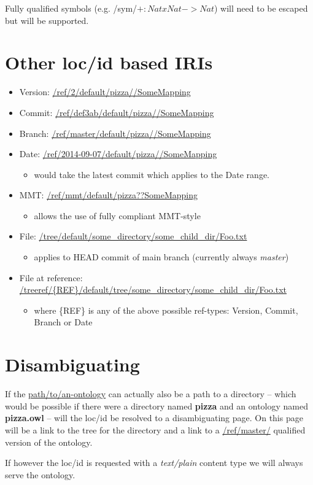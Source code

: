 \documentclass[a4paper,11pt,DIV=22]{scrartcl}
\begin{document}
Fully qualified symbols (e.g. /sym/$+:NatxNat->Nat$) will need to be escaped
but will be supported.

\section{Other loc/id based IRIs}

\begin{itemize}
  \item Version: \url{/ref/2/default/pizza//SomeMapping}
  \item Commit: \url{/ref/def3ab/default/pizza//SomeMapping}
  \item Branch: \url{/ref/master/default/pizza//SomeMapping}
  \item Date: \url{/ref/2014-09-07/default/pizza//SomeMapping}
    \begin{itemize}
      \item would take the latest commit which applies to the Date range.
    \end{itemize}
  \item MMT: \url{/ref/mmt/default/pizza??SomeMapping}
    \begin{itemize}
      \item allows the use of fully compliant MMT-style
    \end{itemize}
  \item File: \url{/tree/default/some_directory/some_child_dir/Foo.txt}
    \begin{itemize}
      \item applies to HEAD commit of main branch (currently always \emph{master})
    \end{itemize}
  \item File at reference: \url{/treeref/{REF}/default/tree/some_directory/some_child_dir/Foo.txt}
    \begin{itemize}
      \item where \{REF\} is any of the above possible ref-types: Version, Commit, Branch or Date
    \end{itemize}
\end{itemize}

\section{Disambiguating}

If the \url{path/to/an-ontology} can actually also be a path to a directory  --
which would be possible if there were a directory named \textbf{pizza} and an
ontology named \textbf{pizza.owl} -- will the loc/id be resolved to a
disambiguating page. On this page will be a link to the tree for the directory
and a link to a \url{/ref/master/} qualified version of the ontology.

If however the loc/id is requested with a \emph{text/plain} content type we
will always serve the ontology.
\end{document}

